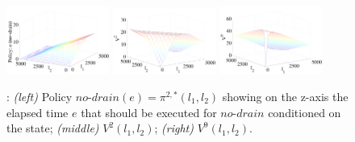 \begin{figure}[tbp!]
\centering
\includegraphics[width=0.30\textwidth]{Figures/policy-iteration2-3.pdf}
\includegraphics[width=0.30\textwidth]{Figures/V2.pdf}
\includegraphics[width=0.30\textwidth]{Figures/V9.pdf}
\vspace{-2mm}
\caption{\footnotesize 
\WaterReservoir: 
{\it (left)} Policy $\mathit{no}$-$\mathit{drain}(e)=\pi^{2,*}(l_1,l_2)$ 
showing on the z-axis the elapsed time $e$ that should be executed 
for $\mathit{no}$-$\mathit{drain}$ conditioned on the state; 
{\it (middle)} $V^2(l_1,l_2)$; 
{\it (right)} $V^9(l_1,l_2)$.
}
\label{fig:v2plots}
\vspace{-5mm}
\end{figure}


